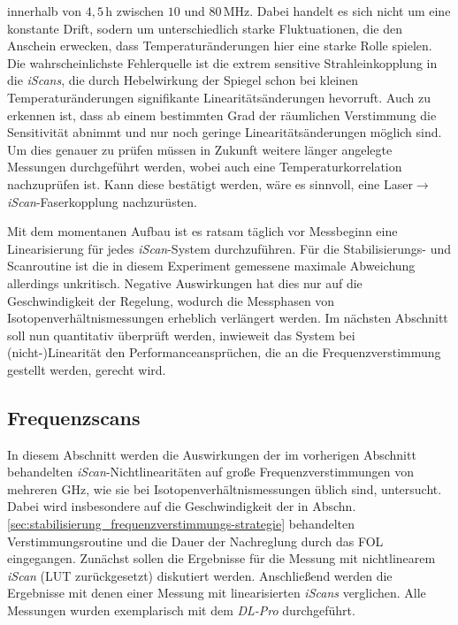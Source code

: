 innerhalb von $4,5\,$h zwischen $10$ und $80\,$MHz. Dabei handelt es sich
nicht um eine konstante Drift, sodern um unterschiedlich starke Fluktuationen,
die den Anschein erwecken, dass Temperaturänderungen hier eine starke Rolle
spielen. Die wahrscheinlichste Fehlerquelle ist die extrem sensitive
Strahleinkopplung in die \textit{iScans}, die durch Hebelwirkung der Spiegel
schon bei kleinen Temperaturänderungen signifikante Linearitätsänderungen hevorruft. Auch zu
erkennen ist, dass ab einem bestimmten Grad der räumlichen Verstimmung die
Sensitivität abnimmt und nur noch geringe Linearitätsänderungen möglich sind. Um
dies genauer zu prüfen müssen in Zukunft weitere länger angelegte Messungen
durchgeführt werden, wobei auch eine Temperaturkorrelation nachzuprüfen ist.
Kann diese bestätigt werden, wäre es sinnvoll, eine Laser$\rightarrow$\textit{iScan}-Faserkopplung nachzurüsten.\par
Mit dem momentanen Aufbau ist es ratsam täglich vor Messbeginn eine
Linearisierung für jedes \textit{iScan}-System durchzuführen. Für die
Stabilisierungs- und Scanroutine ist die in diesem Experiment gemessene maximale Abweichung
allerdings unkritisch. Negative Auswirkungen hat dies nur auf die Geschwindigkeit der
Regelung, wodurch die Messphasen von Isotopenverhältnismessungen erheblich
verlängert werden. Im nächsten Abschnitt soll nun quantitativ überprüft werden,
inwieweit das System bei (nicht-)Linearität den Performanceansprüchen, die an
die Frequenzverstimmung gestellt werden, gerecht wird.

\subsection{Frequenzscans}\label{sec:frequenz_scans}
In diesem Abschnitt werden die Auswirkungen der im vorherigen Abschnitt
behandelten \textit{iScan}-Nichtlinearitäten auf große Frequenzverstimmungen
von mehreren GHz, wie sie bei Isotopenverhältnismessungen üblich sind,
untersucht. Dabei wird insbesondere auf die Geschwindigkeit der in Abschn.
\ref{sec:stabilisierung_frequenzverstimmungs-strategie}
behandelten Verstimmungsroutine und die Dauer der Nachreglung durch das FOL
eingegangen. Zunächst sollen die Ergebnisse für die Messung mit nichtlinearem
\textit{iScan} (LUT zurückgesetzt) diskutiert werden. Anschließend werden die
Ergebnisse mit denen einer Messung mit linearisierten \textit{iScans}
verglichen. Alle Messungen wurden exemplarisch mit dem \textit{DL-Pro}
durchgeführt.

